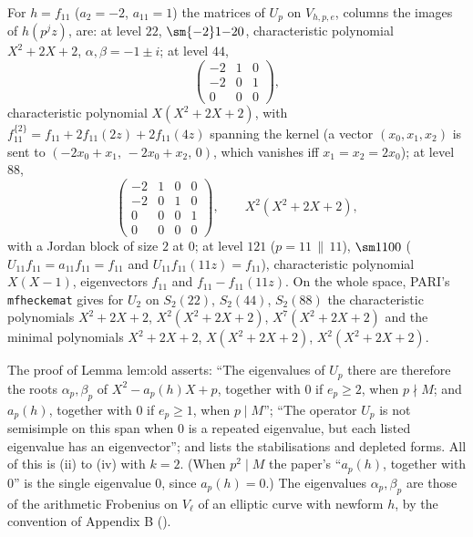 \begin{example}[levels $22$, $44$, $88$, $121$]\label{ex:hecke:Up-matrices}
For $h=f_{11}$ ($a_2=-2$, $a_{11}=1$) the matrices of $U_p$ on $V_{h,p,e}$, columns the images of $h(p^jz)$, are: at level $22$, $\sm{-2}1{-2}0$, characteristic polynomial $X^2+2X+2$,
$\alpha,\beta=-1\pm i$; at level $44$,
\[
\begin{pmatrix}-2&1&0\\-2&0&1\\0&0&0\end{pmatrix},
\]
characteristic polynomial $X(X^2+2X+2)$, with $f_{11}^{\{2\}}=f_{11}+2f_{11}(2z)+2f_{11}(4z)$ spanning the kernel (a vector $(x_0,x_1,x_2)$ is sent to
$(-2x_0+x_1,\,-2x_0+x_2,\,0)$, which vanishes iff $x_1=x_2=2x_0$); at level $88$,
\[
\begin{pmatrix}-2&1&0&0\\-2&0&1&0\\0&0&0&1\\0&0&0&0\end{pmatrix},\qquad X^2(X^2+2X+2),
\]
with a Jordan block of size $2$ at $0$; at level $121$ ($p=11\,\|\,11$), $\sm1100$ ($U_{11}f_{11}=a_{11}f_{11}=f_{11}$ and $U_{11}f_{11}(11z)=f_{11}$), characteristic polynomial $X(X-1)$, eigenvectors $f_{11}$ and $f_{11}-f_{11}(11z)$. On the whole space, PARI's
\texttt{mfheckemat} gives for $U_2$ on $S_2(22)$, $S_2(44)$, $S_2(88)$ the characteristic polynomials $X^2+2X+2$, $X^2(X^2+2X+2)$, $X^7(X^2+2X+2)$ and the minimal polynomials $X^2+2X+2$,
$X(X^2+2X+2)$, $X^2(X^2+2X+2)$.
\end{example}

\begin{paperlink}\label{pl:hecke:lem-old}
The proof of Lemma lem:old asserts: ``The eigenvalues of $U_p$ there are therefore the roots $\alpha_p,\beta_p$ of $X^2-a_p(h)X+p$, together with $0$ if $e_p\ge2$, when $p\nmid M$; and $a_p(h)$,
together with $0$ if $e_p\ge1$, when $p\mid M$''; ``The operator $U_p$ is not semisimple on this span when $0$ is a repeated eigenvalue, but each listed eigenvalue has an eigenvector'';
and lists the stabilisations and depleted forms. All of this is (ii) to (iv) with $k=2$. (When $p^2\mid M$ the paper's ``$a_p(h)$, together with $0$'' is the single
eigenvalue $0$, since $a_p(h)=0$.) The eigenvalues $\alpha_p,\beta_p$ are those of the arithmetic Frobenius on $V_\ell$ of an elliptic curve with newform $h$, by the
convention of Appendix B ().
\end{paperlink}


